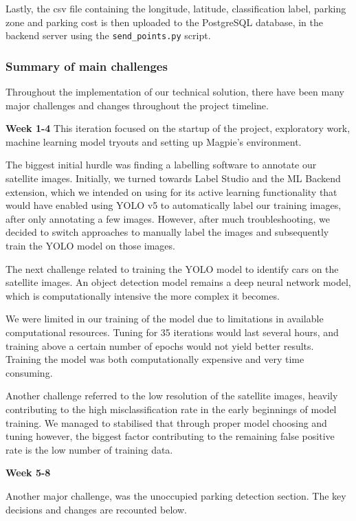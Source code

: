 Lastly, the csv file containing the longitude, latitude, classification label, parking
zone and parking cost is then uploaded to the PostgreSQL database, in the
backend server using the \texttt{send\_points.py} script.

\newpage{}

\subsubsection{Summary of main challenges}
Throughout the implementation of our technical solution, there have been many
major challenges and changes throughout the project timeline.

\textbf{Week 1-4}
This iteration focused on the startup of the project, exploratory work, machine
learning model tryouts and setting up Magpie's environment.

The biggest initial
hurdle was finding a labelling software to annotate our satellite images.
Initially, we turned towards Label Studio and the ML Backend extension, 
which we intended on using
for its active learning functionality that would have enabled using YOLO v5 to
automatically label our training images, after only annotating a few images.
However, after much troubleshooting, we decided to switch approaches to
manually label the images and subsequently train the YOLO model on those images.

The next challenge related to training the YOLO model to identify cars on the
satellite images. An object detection model remains a deep neural network model,
which is computationally intensive the more complex it becomes.

We were limited in our training of the model due to limitations in available
computational resources. Tuning for 35 iterations would last several hours, and
training above a certain number of epochs would not yield better results.
Training the model was both computationally expensive and very time consuming.

Another challenge referred to the low resolution of the satellite images,
heavily contributing to the high misclassification rate in the early beginnings of
model training. We managed to stabilised that through proper model choosing and
tuning however, the biggest factor contributing to the remaining false positive
rate is the low number of training data.

\textbf{Week 5-8}

Another major challenge, was the unoccupied parking detection section. The key
decisions and changes are recounted below.

